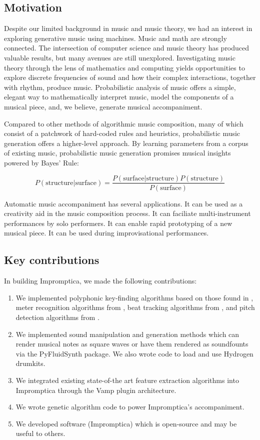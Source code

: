 \documentclass[11pt,conference,letterpaper]{IEEEtran}
\begin{document}
\subsection{Motivation}

Despite our limited background in music and music theory, we had an interest in exploring generative music using machines. Music and math are strongly connected. The intersection of computer science and music theory has produced valuable results, but many avenues are still unexplored. Investigating music theory through the lens of mathematics and computing yields opportunities to explore discrete frequencies of sound and how their complex interactions, together with rhythm, produce music. Probabilistic analysis of music offers a simple, elegant way to mathematically interpret music, model the components of a musical piece, and, we believe, generate musical accompaniment.

Compared to other methods of algorithmic music composition, many of which consist of a patchwork of hard-coded rules and heuristics, probabilistic music generation offers a higher-level approach. By learning parameters from a corpus of existing music, probabilistic music generation promises musical insights powered by Bayes' Rule:

{\small
  \[ P(\text{structure}|\text{surface}) = \frac{P(\text{surface}|\text{structure})P(\text{structure})}{P(\text{surface})} \]
}

Automatic music accompaniment has several applications. It can be used as a creativity aid in the music composition process. It can faciliate multi-instrument performances by solo performers. It can enable rapid prototyping of a new musical piece. It can be used during improvisational performances.

\subsection{Key contributions}

In building Impromptica, we made the following contributions:

\begin{enumerate}
        \item{We implemented polyphonic key-finding algorithms based on those found in \cite{temperly2007mprob}, meter recognition algorithms from \cite{klapuri2006analysis}, beat tracking algorithms from \cite{ellis2007beat}, and pitch detection algorithms from \cite{klapuri2003multiple}.}
        \item{We implemented sound manipulation and generation methods which can render musical notes as square waves or have them rendered as soundfounts via the PyFluidSynth package. We also wrote code to load and use Hydrogen drumkits.}
        \item{We integrated existing state-of-the art feature extraction algorithms into Impromptica through the Vamp plugin architecture.}
        \item{We wrote genetic algorithm code to power Impromptica's accompaniment.}
        \item{We developed software (Impromptica) which is open-source and may be useful to others.}
\end{enumerate}
\end{document}
